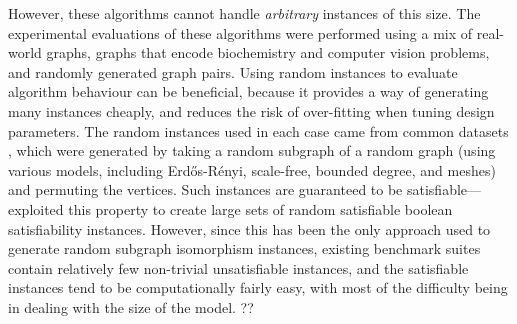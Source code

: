 \documentclass[letterpaper]{article}
\begin{document}

However, these algorithms cannot handle \emph{arbitrary} instances of this size. The experimental
evaluations of these algorithms were performed using a mix of real-world graphs, graphs that encode
biochemistry and computer vision problems, and randomly generated graph pairs. Using random
instances to evaluate algorithm behaviour can be beneficial, because it provides a way of generating
many instances cheaply, and reduces the risk of over-fitting when tuning design parameters. The
random instances used in each case came from common datasets \citep{DeSanto:2003,Zampelli:2010},
which were generated by taking a random subgraph of a random graph (using various models, including
Erd\H{o}s-R\'enyi, scale-free, bounded degree, and meshes) and permuting the vertices. Such
instances are guaranteed to be satisfiable---\citet{Anton:2009} exploited this property to create
large sets of random satisfiable boolean satisfiability instances.  However, since this has been the
only approach used to generate random subgraph isomorphism instances, existing benchmark suites
contain relatively few non-trivial unsatisfiable instances, and the satisfiable instances tend to be
computationally fairly easy, with most of the difficulty being in dealing with the size of the
model.  ?? \citet{Battiti:2007}
\end{document}
